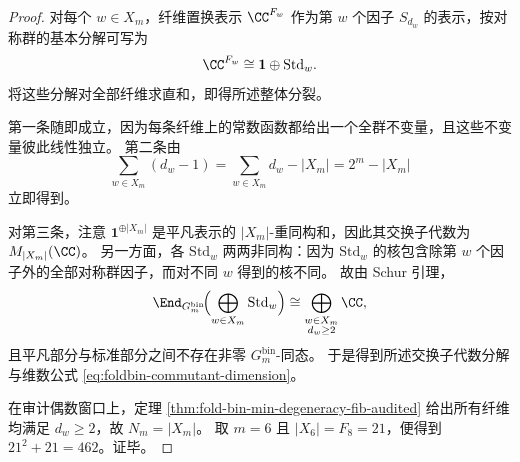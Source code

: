 \begin{proof}
对每个 \(w\in X_m\)，纤维置换表示 \(\CC^{F_w}\) 作为第 \(w\) 个因子 \(S_{d_w}\) 的表示，按对称群的基本分解可写为
\[
\CC^{F_w}\cong \mathbf 1\oplus \mathrm{Std}_w.
\]
将这些分解对全部纤维求直和，即得所述整体分裂。

第一条随即成立，因为每条纤维上的常数函数都给出一个全群不变量，且这些不变量彼此线性独立。
第二条由
\[
\sum_{w\in X_m}(d_w-1)=\sum_{w\in X_m}d_w-|X_m|=2^m-|X_m|
\]
立即得到。

对第三条，注意 \(\mathbf 1^{\oplus |X_m|}\) 是平凡表示的 \(|X_m|\)-重同构和，因此其交换子代数为 \(M_{|X_m|}(\CC)\)。
另一方面，各 \(\mathrm{Std}_w\) 两两非同构：因为 \(\mathrm{Std}_w\) 的核包含除第 \(w\) 个因子外的全部对称群因子，而对不同 \(w\) 得到的核不同。
故由 Schur 引理，
\[
\End_{G_m^{\mathrm{bin}}}\!\Bigl(\bigoplus_{w\in X_m}\mathrm{Std}_w\Bigr)
\cong
\bigoplus_{\substack{w\in X_m\\ d_w\ge 2}}\CC,
\]
且平凡部分与标准部分之间不存在非零 \(G_m^{\mathrm{bin}}\)-同态。
于是得到所述交换子代数分解与维数公式 \eqref{eq:foldbin-commutant-dimension}。

在审计偶数窗口上，定理 \ref{thm:fold-bin-min-degeneracy-fib-audited} 给出所有纤维均满足 \(d_w\ge 2\)，故 \(N_m=|X_m|\)。
取 \(m=6\) 且 \(|X_6|=F_8=21\)，便得到 \(21^2+21=462\)。证毕。
\end{proof}

